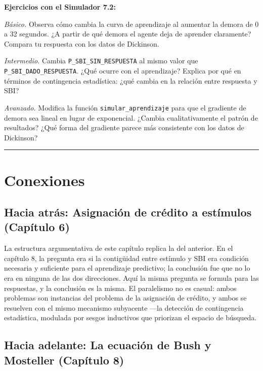 \documentclass[
  letterpaper,
  DIV=11,
  numbers=noendperiod]{scrreprt}
\begin{document}
\begin{tcolorbox}[enhanced jigsaw, arc=.35mm, bottomrule=.15mm, breakable, colback=white, colframe=quarto-callout-note-color-frame, left=2mm, leftrule=.75mm, opacityback=0, rightrule=.15mm, toprule=.15mm]
\textbf{Ejercicios con el Simulador 7.2:}

\emph{Básico.} Observa cómo cambia la curva de aprendizaje al aumentar
la demora de 0 a 32 segundos. ¿A partir de qué demora el agente deja de
aprender claramente? Compara tu respuesta con los datos de Dickinson.

\emph{Intermedio.} Cambia \texttt{P\_SBI\_SIN\_RESPUESTA} al mismo valor
que \texttt{P\_SBI\_DADO\_RESPUESTA}. ¿Qué ocurre con el aprendizaje?
Explica por qué en términos de contingencia estadística: ¿qué cambia en
la relación entre respuesta y SBI?

\emph{Avanzado.} Modifica la función \texttt{simular\_aprendizaje} para
que el gradiente de demora sea lineal en lugar de exponencial. ¿Cambia
cualitativamente el patrón de resultados? ¿Qué forma del gradiente
parece más consistente con los datos de Dickinson?

\begin{center}\rule{0.5\linewidth}{0.5pt}\end{center}

\section{Conexiones}\label{conexiones-2}

\subsection{Hacia atrás: Asignación de crédito a estímulos (Capítulo
6)}\label{hacia-atruxe1s-asignaciuxf3n-de-cruxe9dito-a-estuxedmulos-capuxedtulo-6}

La estructura argumentativa de este capítulo replica la del anterior. En
el capítulo 8, la pregunta era si la contigüidad entre estímulo y SBI
era condición necesaria y suficiente para el aprendizaje predictivo; la
conclusión fue que no lo era en ninguna de las dos direcciones. Aquí la
misma pregunta se formula para las respuestas, y la conclusión es la
misma. El paralelismo no es casual: ambos problemas son instancias del
problema de la asignación de crédito, y ambos se resuelven con el mismo
mecanismo subyacente ---la detección de contingencia estadística,
modulada por sesgos inductivos que priorizan el espacio de búsqueda.

\subsection{Hacia adelante: La ecuación de Bush y Mosteller (Capítulo
8)}\label{hacia-adelante-la-ecuaciuxf3n-de-bush-y-mosteller-capuxedtulo-8}


\end{tcolorbox}
\end{document}
